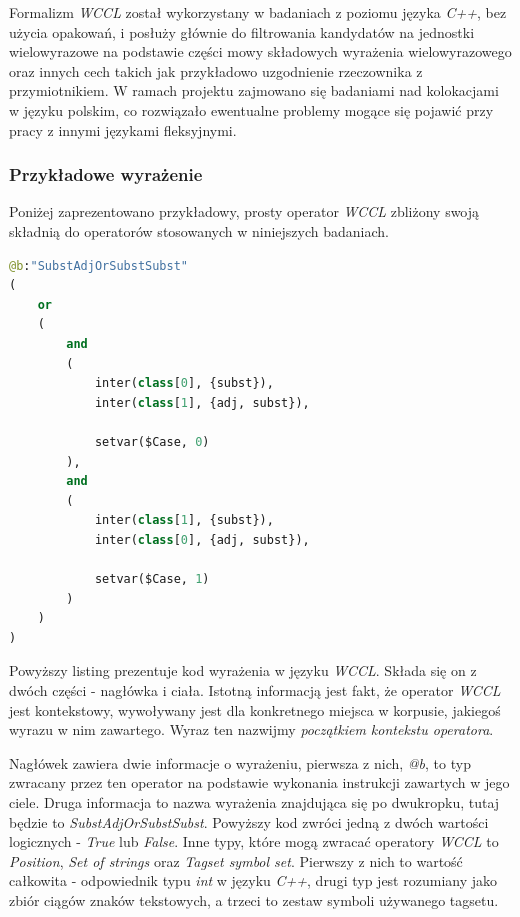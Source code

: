 \documentclass[11pt,a4paper]{llncs}
\begin{document}
Formalizm \emph{WCCL} został wykorzystany w badaniach z poziomu języka \emph{C++}, bez użycia opakowań, i posłuży głównie do filtrowania kandydatów na jednostki wielowyrazowe na podstawie części mowy składowych wyrażenia wielowyrazowego oraz innych cech takich jak przykładowo uzgodnienie rzeczownika z przymiotnikiem.
W ramach projektu zajmowano się badaniami nad kolokacjami w języku polskim, co rozwiązało ewentualne problemy mogące się pojawić przy pracy z innymi językami fleksyjnymi.


\subsubsection{Przykładowe wyrażenie}
Poniżej zaprezentowano przykładowy, prosty operator \emph{WCCL} zbliżony swoją składnią do operatorów stosowanych w niniejszych badaniach. 

\begin{lstlisting}[frame=single, tabsize=2, language=Python, caption=Przykładowe wyrażenie w języku \emph{WCCL}, captionpos=b, breaklines=true, basicstyle=\scriptsize]
@b:"SubstAdjOrSubstSubst"
(
	or
	(
		and
		(
			inter(class[0], {subst}),
			inter(class[1], {adj, subst}),
		
			setvar($Case, 0)
		),
		and
		(
			inter(class[1], {subst}),
			inter(class[0], {adj, subst}),
		
			setvar($Case, 1)
		)
	)
)
\end{lstlisting}

Powyższy listing prezentuje kod wyrażenia w języku \emph{WCCL}.
Składa się on z dwóch części - nagłówka i ciała.
Istotną informacją jest fakt, że operator \emph{WCCL} jest kontekstowy, wywoływany jest dla konkretnego miejsca w korpusie, jakiegoś wyrazu w nim zawartego.
Wyraz ten nazwijmy \emph{początkiem kontekstu operatora}.



Nagłówek zawiera dwie informacje o wyrażeniu, pierwsza z nich, \emph{@b}, to typ zwracany przez ten operator na podstawie wykonania instrukcji zawartych w jego ciele. 
Druga informacja to nazwa wyrażenia znajdująca się po dwukropku, tutaj będzie to \emph{SubstAdjOrSubstSubst}.
Powyższy kod zwróci jedną z dwóch wartości logicznych - \emph{True} lub \emph{False}.
Inne typy, które mogą zwracać operatory \emph{WCCL} to \emph{Position}, \emph{Set of strings} oraz \emph{Tagset symbol set}.
Pierwszy z nich to wartość całkowita - odpowiednik typu \emph{int} w języku \emph{C++}, drugi typ jest rozumiany jako zbiór ciągów znaków tekstowych, a trzeci to zestaw symboli używanego tagsetu.
\end{document}
